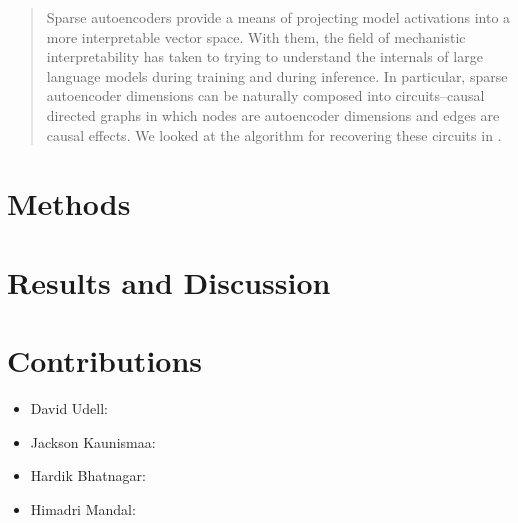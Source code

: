 \documentclass[10pt]{article}
\begin{document}

\printAffiliationsAndNotice{}

\begin{abstract}
Sparse autoencoders provide a means of projecting model activations into a more interpretable vector space. With them, the field of mechanistic interpretability has taken to trying to understand the internals of large language models during training and during inference. In particular, sparse autoencoder dimensions can be naturally composed into circuits--causal directed graphs in which nodes are autoencoder dimensions and edges are causal effects. We looked at the algorithm for recovering these circuits in \citet{marks2024}.
\end{abstract}


\section{Methods}


\section{Results and Discussion}



\section*{Contributions}
\begin{itemize}
\item David Udell:
\item Jackson Kaunismaa:
\item Hardik Bhatnagar:
\item Himadri Mandal:
\end{itemize}



\end{document}

